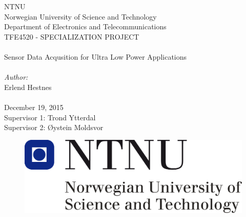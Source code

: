 \thispagestyle{empty}

\begin{center}

\Large{NTNU}\\
\normalsize{Norwegian University of Science and Technology}\\
Department of Electronics and Telecommunications\\
[1pc]
\Large{TFE4520 - SPECIALIZATION PROJECT}\\

\Huge{\hrulefill\\Sensor Data Acqusition for Ultra Low Power Applications\\\hrulefill}\\[2pc]

\small{\textit{Author:}}\\\Large{Erlend Hestnes}\\
\mbox{}\\[3pc]
\large{December 19, 2015}\\[2pc]

\small{Supervisor 1: Trond Ytterdal} \\
\small{Supervisor 2: Øystein Moldsvor}

\end{center}
\vfill

\begin{figure}[h]
\centering
\includegraphics[scale=0.5]{fig/NTNU.png}
\label{fig:frontpage_logo}
\end{figure}
